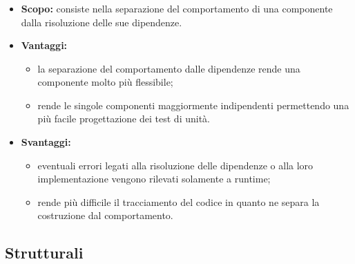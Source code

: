     \subsubsection{}
     \begin{itemize}
       \item \textbf{Scopo:} consiste nella separazione del comportamento di una componente dalla risoluzione delle sue dipendenze.
	\item \textbf{Vantaggi:}
	  \begin{itemize}
	   \item la separazione del comportamento dalle dipendenze rende una componente molto più flessibile;
	   \item rende le singole componenti maggiormente indipendenti permettendo una più facile progettazione dei test di unità.
	  \end{itemize}
	\item \textbf{Svantaggi:}
	  \begin{itemize}
	   \item eventuali errori legati alla risoluzione delle dipendenze o alla loro implementazione vengono rilevati solamente a runtime;
	   \item rende più difficile il tracciamento del codice in quanto ne separa la costruzione dal comportamento.
	  \end{itemize}
	\end{itemize}
  
  \subsection{Strutturali}
  
